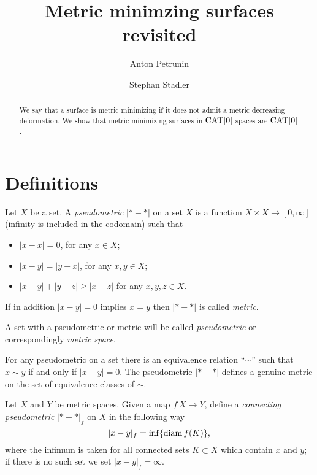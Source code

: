 \documentclass[a4paper,10pt]{amsart}
\begin{document}
\title{Metric minimzing surfaces revisited}
\author{Anton Petrunin}
\address{A. Petrunin\newline\vskip-4mm
Math. Dept. PSU,
University Park, PA 16802,
USA}
\author{Stephan Stadler}
\address{S. Stadler\newline\vskip-4mm
Math. Inst.,
Universit\"at M\"unchen, Theresienstr. 39, D-80333 M\"unchen, Germany}


\date{}

\begin{abstract}
We say that a surface is metric minimizing if it does not admit a metric decreasing deformation.
We show that metric minimizing surfaces in $\mathop{\rm CAT}\nolimits[0]$ spaces are $\mathop{\rm CAT}\nolimits[0]$.
\end{abstract}
\maketitle



\section{Definitions}

Let $X$ be a set.
A \emph{pseudometric} $|{*}-{*}|$ on a set $X$ 
is a function $X\times X\to[0,\infty]$ (infinity is included in the codomain)
such that 
\begin{itemize}
\item $|x-x|=0$, for any $x\in X$;
\item $|x-y|=|y-x|$, for any $x,y\in X$;
\item $|x-y|+|y-z|\ge|x-z|$ for any  $x,y,z\in X$.
\end{itemize}

If in addition $|x-y|=0$ implies $x=y$ then $|{*}-{*}|$ is called \emph{metric}.


A set with a pseudometric or metric will be called \emph{pseudometric} or correspondingly \emph{metric space}.

For any pseudometric on a set 
there is an equivalence relation ``$\sim$''
such that $x\sim y$ if and only if $|x-y|=0$.
The pseudometric $|{*}-{*}|$ defines a genuine metric on the set of equivalence classes of $\sim$.

Let $X$ and $Y$ be metric spaces.
Given a map $f\:X\to Y$,
define a \emph{connecting pseudometric} $|{*}-{*}|_f$ on $X$ in
the following way
\[|x-y|_f=\inf\{\mathop{\rm diam}\nolimits f(K)\},\]
where the infimum is taken for all connected sets $K\subset X$ which contain $x$ and $y$;
if there is no such set we set $|x-y|_f=\infty$.
\end{document}
